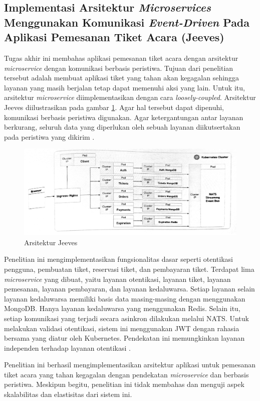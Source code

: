 \subsection{Implementasi Arsitektur \textit{Microservices} Menggunakan Komunikasi \textit{Event-Driven} Pada Aplikasi Pemesanan Tiket Acara (Jeeves)}

Tugas akhir ini membahas aplikasi pemesanan tiket acara dengan arsitektur \textit{microservice} dengan komunikasi berbasis peristiwa. Tujuan dari penelitian tersebut adalah membuat aplikasi tiket yang tahan akan kegagalan sehingga layanan yang masih berjalan tetap dapat memenuhi aksi yang lain. Untuk itu, arsitektur \textit{microservice} diimplementasikan dengan cara \textit{loosely-coupled}. Arsitektur Jeeves diilustrasikan pada gambar \ref{fig:jeeves-architecture}. Agar hal tersebut dapat dipenuhi, komunikasi berbasis peristiwa digunakan. Agar ketergantungan antar layanan berkurang, seluruh data yang diperlukan oleh sebuah layanan diikutsertakan pada peristiwa yang dikirim \parencite{microservicesEventDriven}.

\begin{figure}[htbp]
    \centering
    \includegraphics[width=1\textwidth]{resources/chapter-2/jeeves.png}
    \caption{Arsitektur Jeeves \parencite{microservicesEventDriven}}
    \label{fig:jeeves-architecture}
\end{figure}

Penelitian ini mengimplementasikan fungsionalitas dasar seperti otentikasi pengguna, pembuatan tiket, reservasi tiket, dan pembayaran tiket. Terdapat lima \textit{microservice} yang dibuat, yaitu layanan otentikasi, layanan tiket, layanan pemesanan, layanan pembayaran, dan layanan kedaluwarsa. Setiap layanan selain layanan kedaluwarsa memiliki basis data masing-masing dengan menggunakan MongoDB. Hanya layanan kedaluwarsa yang menggunakan Redis. Selain itu, setiap komunikasi yang terjadi secara asinkron dilakukan melalui NATS. Untuk melakukan validasi otentikasi, sistem ini menggunakan JWT dengan rahasia bersama yang diatur oleh Kubernetes. Pendekatan ini memungkinkan layanan independen terhadap layanan otentikasi \parencite{microservicesEventDriven}.

Penelitian ini berhasil mengimplementasikan arsitektur aplikasi untuk pemesanan tiket acara yang tahan kegagalan dengan pendekatan \textit{microservice} dan berbasis peristiwa. Meskipun begitu, penelitian ini tidak membahas dan menguji aspek skalabilitas dan elastisitas dari sistem ini.